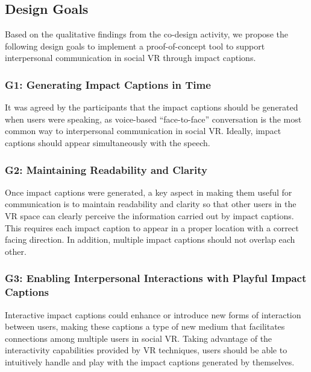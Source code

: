 


\subsection{Design Goals}
\label{section_design_goals}
Based on the qualitative findings from the co-design activity, we propose the following design goals to implement a proof-of-concept tool to support interpersonal communication in social VR through impact captions.

\subsubsection{G1: Generating Impact Captions in Time}
It was agreed by the participants that the impact captions should be generated when users were speaking, as voice-based ``face-to-face'' conversation is the most common way to interpersonal communication in social VR. Ideally, impact captions should appear simultaneously with the speech.

\subsubsection{G2: Maintaining Readability and Clarity}
Once impact captions were generated, a key aspect in making them useful for communication is to maintain readability and clarity so that other users in the VR space can clearly perceive the information carried out by impact captions. This requires each impact caption to appear in a proper location with a correct facing direction. In addition, multiple impact captions should not overlap each other.

\subsubsection{G3: Enabling Interpersonal Interactions with Playful Impact Captions}
Interactive impact captions could enhance or introduce new forms of interaction between users, making these captions a type of new medium that facilitates connections among multiple users in social VR. 
Taking advantage of the interactivity capabilities provided by VR techniques, users should be able to intuitively handle and play with the impact captions generated by themselves. 

